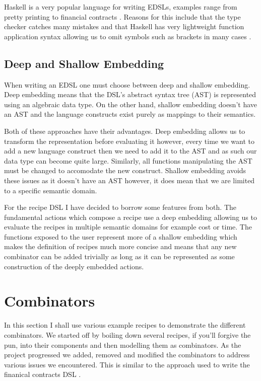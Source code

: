 \documentclass[11pt]{article}
\begin{document}
\medbreak

Haskell is a very popular language for writing EDSLs, examples
range from pretty printing \cite{pretty} to financial contracts \cite{contracts}.
Reasons for this include that the type checker catches many mistakes
and that Haskell has very lightweight function application syntax
allowing us to omit symbols such as brackets in many cases \cite{snoyman}.

\subsection{Deep and Shallow Embedding}
When writing an EDSL one must choose between deep and shallow embedding.
Deep embedding means that the DSL's abstract syntax tree (AST) is
represented using an algebraic data type. On the other hand, shallow
embedding doesn't have an AST and the language constructs exist purely
as mappings to their semantics.

\medbreak

Both of these approaches have their advantages. Deep embedding
allows us to transform the representation before evaluating
it however, every time we want to add a new language construct
then we need to add it to the AST and as such our data type
can become quite large. Similarly, all functions manipulating
the AST must be changed to accomodate the new construct. Shallow
embedding avoids these issues as it doesn't have an AST however,
it does mean that we are limited to a specific semantic domain.

\medbreak

For the recipe DSL I have decided to borrow some features from
both. The fundamental actions which compose a recipe use a
deep embedding allowing us to evaluate the recipes in multiple
semantic domains for example cost or time. The functions
exposed to the user represent more of a shallow embedding
which makes the definition of recipes much more concise and
means that any new combinator can be added trivially as long
as it can be represented as some construction of the deeply
embedded actions.

\section{Combinators}

In this section I shall use various example recipes to demonstrate
the different combinators. We started off by boiling down several
recipes, if you'll forgive the pun, into their components and
then modelling them as combinators. As the project progressed
we added, removed and modified the combinators to address
various issues we encountered. This is similar to the approach
used to write the finanical contracts DSL \cite{contracts}.
\end{document}
